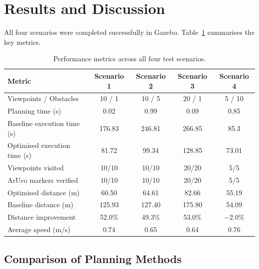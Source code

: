 \documentclass[11pt,a4paper]{article}
\begin{document}
\section{Results and Discussion}

All four scenarios were completed successfully in Gazebo. Table~\ref{tab:results} summarises the key metrics.

\begin{table}[H]
\centering
\caption{Performance metrics across all four test scenarios.}
\label{tab:results}
\begin{tabular}{lcccc}
\toprule
\textbf{Metric} & \textbf{Scenario 1} & \textbf{Scenario 2} & \textbf{Scenario 3} & \textbf{Scenario 4} \\
\midrule
Viewpoints / Obstacles     & 10 / 1  & 10 / 5  & 20 / 1  & 5 / 10  \\
Planning time (s)          & 0.02    & 0.99    & 0.09    & 0.85    \\
Baseline execution time (s)         & 176.83   & 246.81   & 266.85  & 85.3   \\
Optimised execution time (s)         & 81.72   & 99.34   & 128.85  & 73.01   \\
Viewpoints visited         & 10/10   & 10/10   & 20/20   & 5/5     \\
ArUco markers verified     & 10/10   & 10/10   & 20/20   & 5/5     \\
Optimised distance (m)     & 60.50   & 64.61   & 82.66   & 55.19   \\
Baseline distance (m)      & 125.93  & 127.40  & 175.80  & 54.09   \\
Distance improvement       & 52.0\%  & 49.3\%  & 53.0\%  & $-$2.0\% \\
Average speed (m/s)        & 0.74    & 0.65    & 0.64    & 0.76    \\

\bottomrule
\end{tabular}
\end{table}

\subsection{Comparison of Planning Methods}
\end{document}
